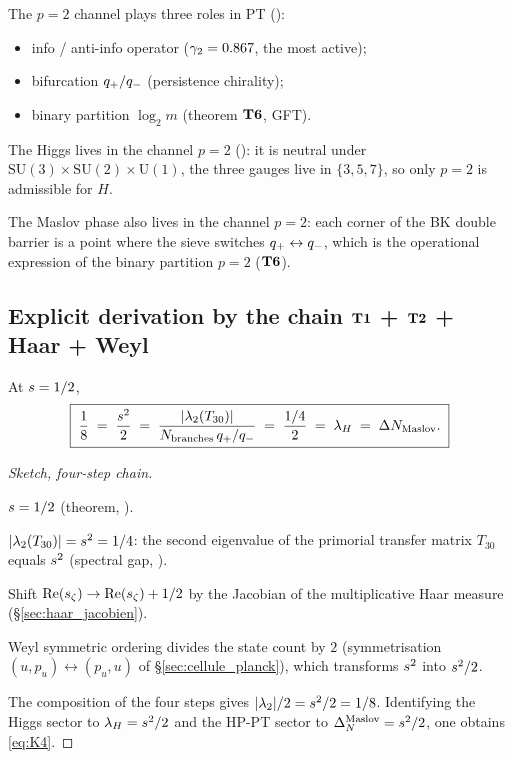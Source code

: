 The $p = 2$ channel plays three roles in PT
(\cite{PT_M1}):
\begin{itemize}[nosep,leftmargin=*]
\item info / anti-info operator ($\gamma_{2} = 0.867$, the most active);
\item bifurcation $q_{+}/q_{-}$ (persistence chirality);
\item binary partition $\log_2 m$ (theorem $\textbf{T6}$, GFT).
\end{itemize}

The Higgs lives in the channel $p = 2$
(\cite{PT_M5}): it is neutral under
$\mathrm{SU}(3) \times \mathrm{SU}(2) \times \mathrm{U}(1)$, the
three gauges live in $\{3, 5, 7\}$, so only $p = 2$ is admissible
for $H$.

The Maslov phase also lives in the channel $p = 2$: each corner of
the BK double barrier is a point where the sieve switches
$q_{+} \leftrightarrow q_{-}$, which is the operational expression
of the binary partition $p = 2$ ($\textbf{T6}$).

\subsection{Explicit derivation by the chain $\Tone$ + $\Ttwo$ + Haar + Weyl}
\label{sec:chaine_t1t2haarweyl}

\begin{theoreme}
\label{thm:chaine}
At $s = 1/2$,
\begin{equation}
\boxed{\;\dfrac{1}{8} \;=\; \dfrac{s^{2}}{2} \;=\; \dfrac{|\lambda_2(T_{30})|}{N_{\mathrm{branches}}\,q_{+}/q_{-}} \;=\; \dfrac{1/4}{2} \;=\; \lambda_H \;=\; \Delta N_{\mathrm{Maslov}}.\;}
\label{eq:K4}
\end{equation}
\end{theoreme}

\begin{proof}[Sketch, four-step chain]
\begin{description}[nosep,leftmargin=*]
\item[$\Tone$.] $s = 1/2$ (theorem, \cite{PT_M1}).
\item[$\Ttwo$.] $|\lambda_2(T_{30})| = s^{2} = 1/4$: the second
eigenvalue of the primorial transfer matrix $T_{30}$ equals
$s^{2}$ (spectral gap, \cite{PT_M1}).
\item[Haar.] Shift $\operatorname{Re}(s_\zeta) \to \operatorname{Re}(s_\zeta) + 1/2$ by the
Jacobian of the multiplicative Haar measure
(\S\ref{sec:haar_jacobien}).
\item[Weyl.] Weyl symmetric ordering divides the state count by $2$
(symmetrisation $(u, p_u) \leftrightarrow (p_u, u)$ of
\S\ref{sec:cellule_planck}), which transforms $s^{2}$ into
$s^{2}/2$.
\end{description}
The composition of the four steps gives
$|\lambda_2|/2 = s^{2}/2 = 1/8$. Identifying the Higgs sector to
$\lambda_H = s^{2}/2$ and the HP-PT sector to
$\Delta_N^{\mathrm{Maslov}} = s^{2}/2$, one obtains \eqref{eq:K4}.
\end{proof}

